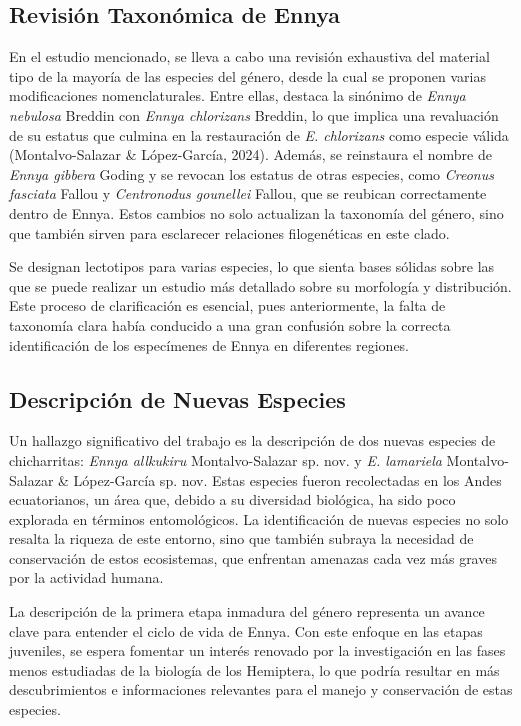 \documentclass[
  letterpaper,
  DIV=11,
  numbers=noendperiod,
  oneside]{scrreprt}
\begin{document}
\subsection{Revisión Taxonómica de
Ennya}\label{revisiuxf3n-taxonuxf3mica-de-ennya}

En el estudio mencionado, se lleva a cabo una revisión exhaustiva del
material tipo de la mayoría de las especies del género, desde la cual se
proponen varias modificaciones nomenclaturales. Entre ellas, destaca la
sinónimo de \emph{Ennya nebulosa} Breddin con \emph{Ennya chlorizans}
Breddin, lo que implica una revaluación de su estatus que culmina en la
restauración de \emph{E. chlorizans} como especie válida
(Montalvo-Salazar \& López-García, 2024). Además, se reinstaura el
nombre de \emph{Ennya gibbera} Goding y se revocan los estatus de otras
especies, como \emph{Creonus fasciata} Fallou y \emph{Centronodus
gounellei} Fallou, que se reubican correctamente dentro de Ennya. Estos
cambios no solo actualizan la taxonomía del género, sino que también
sirven para esclarecer relaciones filogenéticas en este clado.

Se designan lectotipos para varias especies, lo que sienta bases sólidas
sobre las que se puede realizar un estudio más detallado sobre su
morfología y distribución. Este proceso de clarificación es esencial,
pues anteriormente, la falta de taxonomía clara había conducido a una
gran confusión sobre la correcta identificación de los especímenes de
Ennya en diferentes regiones.

\subsection{Descripción de Nuevas
Especies}\label{descripciuxf3n-de-nuevas-especies}

Un hallazgo significativo del trabajo es la descripción de dos nuevas
especies de chicharritas: \emph{Ennya allkukiru} Montalvo-Salazar sp.
nov. y \emph{E. lamariela} Montalvo-Salazar \& López-García sp. nov.
Estas especies fueron recolectadas en los Andes ecuatorianos, un área
que, debido a su diversidad biológica, ha sido poco explorada en
términos entomológicos. La identificación de nuevas especies no solo
resalta la riqueza de este entorno, sino que también subraya la
necesidad de conservación de estos ecosistemas, que enfrentan amenazas
cada vez más graves por la actividad humana.

La descripción de la primera etapa inmadura del género representa un
avance clave para entender el ciclo de vida de Ennya. Con este enfoque
en las etapas juveniles, se espera fomentar un interés renovado por la
investigación en las fases menos estudiadas de la biología de los
Hemiptera, lo que podría resultar en más descubrimientos e informaciones
relevantes para el manejo y conservación de estas especies.
\end{document}
